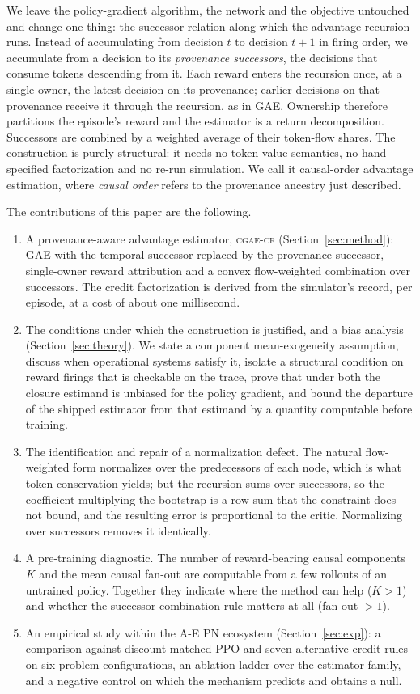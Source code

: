 \documentclass[review,authoryear,3p,times]{elsarticle}
\newcommand{\cflow}{\textsc{cgae-cf}}          %
\begin{document}
We leave the policy-gradient algorithm, the network and the objective
untouched and change one thing: the successor relation along which the
advantage recursion runs. Instead of accumulating from decision $t$ to decision
$t+1$ in firing order, we accumulate from a decision to its \emph{provenance
successors}, the decisions that consume tokens descending from it. Each reward
enters the recursion once, at a single owner, the latest decision on its
provenance; earlier decisions on that provenance receive it through the
recursion, as in GAE. Ownership therefore partitions the episode's reward and
the estimator is a return decomposition. Successors are combined by a weighted
average of their token-flow shares. The construction is purely structural: it needs no
token-value semantics, no hand-specified factorization and no re-run
simulation. We call it causal-order advantage estimation, where \emph{causal
order} refers to the provenance ancestry just described.

The contributions of this paper are the following.
\begin{enumerate}
\item A provenance-aware advantage estimator, \cflow{}
(Section~\ref{sec:method}): GAE with the temporal successor replaced by the
provenance successor, single-owner reward attribution and a convex
flow-weighted combination over successors. The credit factorization is derived
from the simulator's record, per episode, at a cost of about one millisecond.
\item The conditions under which the construction is justified, and a bias
analysis (Section~\ref{sec:theory}). We state a component mean-exogeneity
assumption, discuss when operational systems satisfy it, isolate a structural
condition on reward firings that is checkable on the trace, prove that under
both the closure estimand is unbiased for the policy gradient, and bound the
departure of the shipped estimator from that estimand by a quantity computable
before training.
\item The identification and repair of a normalization defect. The natural
flow-weighted form normalizes over the predecessors of each node, which is what
token conservation yields; but the recursion sums over successors, so the
coefficient multiplying the bootstrap is a row sum that the constraint does not
bound, and the resulting error is proportional to the critic. Normalizing over
successors removes it identically.
\item A pre-training diagnostic. The number of reward-bearing causal
components $K$ and the mean causal fan-out are computable from a few rollouts
of an untrained policy. Together they indicate where the method can help
($K>1$) and whether the successor-combination rule matters at all (fan-out
$>1$).
\item An empirical study within the A-E PN ecosystem (Section~\ref{sec:exp}):
a comparison against discount-matched PPO and seven alternative credit rules on
six problem configurations, an ablation ladder over the estimator family, and a
negative control on which the mechanism predicts and obtains a null.
\end{enumerate}
\end{document}
